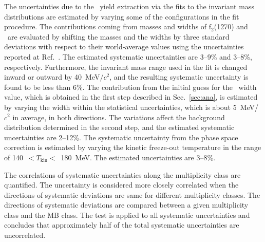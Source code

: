 The uncertainties due to the \fzero~yield extraction via the fits to the invariant mass distributions are estimated by varying some of the configurations in the fit procedure. The contributions coming from masses and widths of $\mathrm{f}_{2}$(1270) and \rhoz~are evaluated by shifting the masses and the widths by three standard deviations with respect to their world-average values using the uncertainties reported at Ref.~\cite{ParticleDataGroup:2022pth}. The estimated systematic uncertainties are 3--9\% and 3--8\%, respectively. Furthermore, the invariant mass range used in the fit is changed inward or outward by 40~MeV$/c^{2}$, and the resulting systematic uncertainty is found to be less than 6\%. The contribution from the initial guess for the \fzero~width value, which is obtained in the first step described in Sec.~\ref{sec:ana}, is estimated by varying the width within the statistical uncertainties, which is about 5~MeV/$c{^2}$ in average, in both directions. The variations affect the background distribution determined in the second step, and the estimated systematic uncertainties are 2--12\%. The systematic uncertainty from the phase space correction is estimated by varying the kinetic freeze-out temperature in the range of 140~$<T_{\mathrm{kin}}<$~180~MeV. The estimated uncertainties are 3--8\%. 

The correlations of systematic uncertainties along the multiplicity class are quantified. The uncertainty is considered more closely correlated when the directions of systematic deviations are same for different multiplicity classes. The directions of systematic deviations are compared between a given multiplicity class and the MB class. The test is applied to all systematic uncertainties and concludes that approximately half of the total systematic uncertainties are uncorrelated.